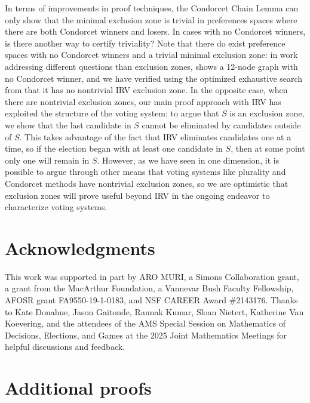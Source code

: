 \documentclass{article}
\theoremstyle{theorem}
\theoremstyle{definition}
\begin{document}
In terms of improvements in proof techniques, the Condorcet Chain Lemma can only show that the minimal exclusion zone is trivial in preferences spaces where there are both Condorcet winners and losers. In cases with no Condorcet winners, is there another way to certify triviality? Note that there do exist preference spaces with no Condorcet winners and a trivial minimal exclusion zone: in work addressing different questions than exclusion zones, \citet[Figure 2]{skibski2023closeness} shows a 12-node graph with no Condorcet winner, and we have verified using the optimized exhaustive search from  that it has no nontrivial IRV exclusion zone. In the opposite case, when there are nontrivial exclusion zones, our main proof approach with IRV has exploited the structure of the voting system: to argue that $S$ is an exclusion zone, we show that the last candidate in $S$ cannot be eliminated by candidates outside of $S$. This takes advantage of the fact that IRV eliminates candidates one at a time, so if the election began with at least one candidate in $S$, then at some point only one will remain in $S$. However, as we have seen in one dimension, it is possible to argue through other means that voting systems like plurality and Condorcet methods have nontrivial exclusion zones, so we are optimistic that exclusion zones will prove useful beyond IRV in the ongoing endeavor to characterize voting systems. 







\section*{Acknowledgments}
This work was supported in part by ARO MURI, a Simons Collaboration grant, a grant from the MacArthur Foundation, a Vannevar Bush Faculty Fellowship, AFOSR grant FA9550-19-1-0183, and NSF CAREER Award \#2143176.
Thanks to Kate Donahue, Jason Gaitonde, Raunak Kumar, Sloan Nietert, Katherine Van Koevering, and the attendees of the AMS Special Session on Mathematics of Decisions, Elections, and Games at the 2025 Joint Mathematics Meetings  for helpful discussions and feedback.




\appendix
\section{Additional proofs}\label{app:proofs}
\end{document}
